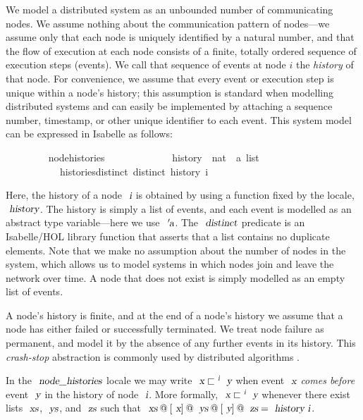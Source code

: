 We model a distributed system as an unbounded number of communicating nodes.
We assume nothing about the communication pattern of nodes---we assume only that each node is uniquely identified by a natural number, and that the flow of execution at each node consists of a finite, totally ordered sequence of execution steps (events).
We call that sequence of events at node $i$ the \emph{history} of that node.
For convenience, we assume that every event or execution step is unique within a node's history; this assumption is standard when modelling distributed systems \cite{Cachin:2011wt} and can easily be implemented by attaching a sequence number, timestamp, or other unique identifier to each event.
This system model can be expressed in Isabelle as follows:
\vspace{0.25em}
\begin{isabellebody}
\ \ \ \ \ \ \ \  node{\isacharunderscore}histories\ {\isacharequal}\ \isanewline
\ \ \ \ \ \ \ \ \ \ \ history\ {\isacharcolon}{\isacharcolon}\ {\isachardoublequoteopen}nat\ {\isasymRightarrow}\ {\isacharprime}a\ list{\isachardoublequoteclose}\ \isanewline
\ \ \ \ \ \ \ \ \ \ \ histories{\isacharunderscore}distinct{\isacharcolon}\ {\isachardoublequoteopen}distinct\ {\isacharparenleft}history\ i{\isacharparenright}{\isachardoublequoteclose}
\end{isabellebody}
\vspace{0.25em}
Here, the history of a node $\isa{i}$ is obtained by using a function fixed by the locale, $\isa{history}$.
The history is simply a list of events, and each event is modelled as an abstract type variable---here we use $\isa{{\isacharprime}a}$.
The $\isa{distinct}$ predicate is an Isabelle/HOL library function that asserts that a list contains no duplicate elements.
Note that we make no assumption about the number of nodes in the system, which allows us to model systems in which nodes join and leave the network over time.
A node that does not exist is simply modelled as an empty list of events.

A node's history is finite, and at the end of a node's history we assume that a node has either failed or successfully terminated.
We treat node failure as permanent, and model it by the absence of any further events in its history.
This \emph{crash-stop} abstraction is commonly used by distributed algorithms \cite{Cachin:2011wt}.

In the $\isa{node{\isacharunderscore}histories}$ locale we may write $\isa{x} \sqsubset^\isa{i} \isa{y}$ when event $\isa{x}$ \emph{comes before} event $\isa{y}$ in the history of node $\isa{i}$.
More formally, $\isa{x} \sqsubset^\isa{i} \isa{y}$ whenever there exist lists $\isa{xs}$, $\isa{ys}$, and $\isa{zs}$ such that $\isa{xs}\mathbin{@}[\isa{x}]\mathbin{@}\isa{ys}\mathbin{@}[\isa{y}]\mathbin{@}\isa{zs} = \isa{history\ i}$.

